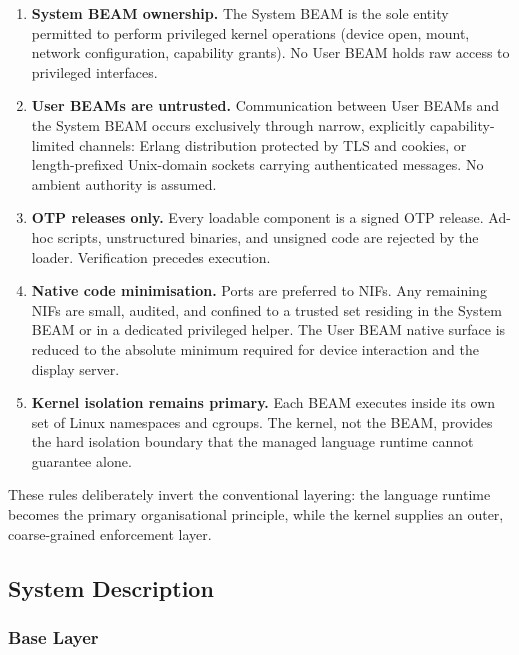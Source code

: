 \documentclass{article}
\begin{document}
\begin{enumerate}[label=\textbf{R\arabic*}]
  \item \textbf{System BEAM ownership.}
  The System BEAM is the sole entity permitted to perform privileged kernel operations (device open, mount, network configuration, capability grants).
  No User BEAM holds raw access to privileged interfaces.

  \item \textbf{User BEAMs are untrusted.}
  Communication between User BEAMs and the System BEAM occurs exclusively through narrow, explicitly capability-limited channels: Erlang distribution protected by TLS and cookies, or length-prefixed Unix-domain sockets carrying authenticated messages.
  No ambient authority is assumed.

  \item \textbf{OTP releases only.}
  Every loadable component is a signed OTP release.
  Ad-hoc scripts, unstructured binaries, and unsigned code are rejected by the loader.
  Verification precedes execution.

  \item \textbf{Native code minimisation.}
  Ports are preferred to NIFs.
  Any remaining NIFs are small, audited, and confined to a trusted set residing in the System BEAM or in a dedicated privileged helper.
  The User BEAM native surface is reduced to the absolute minimum required for device interaction and the display server.

  \item \textbf{Kernel isolation remains primary.}
  Each BEAM executes inside its own set of Linux namespaces and cgroups.
  The kernel, not the BEAM, provides the hard isolation boundary that the managed language runtime cannot guarantee alone.
\end{enumerate}

These rules deliberately invert the conventional layering: the language runtime becomes the primary organisational principle, while the kernel supplies an outer, coarse-grained enforcement layer.

\subsection{System Description}

\subsubsection{Base Layer}
\end{document}
